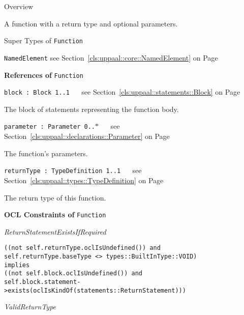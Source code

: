 	\begin{longdescription}
		\item[Overview] 		
				

	

		A function with a return type and optional parameters.		
		\item[Super Types of \texttt{Function}] ~
			\begin{longdescription}
				\item[\texttt{NamedElement}] see Section~\ref{cls:uppaal::core::NamedElement} on Page~\pageref{cls:uppaal::core::NamedElement}						\end{longdescription}
		
	
			\item[\textbf{References of} \texttt{Function}] ~
			\begin{longdescription}
	\item[\texttt{block : Block 	\symbol{"5B}1..1\symbol{"5D}
}] ~
	see Section~\ref{cls:uppaal::statements::Block} on Page~\pageref{cls:uppaal::statements::Block}
	
	\nopagebreak
		
				

	

		The block of statements representing the function body.		
	\item[\texttt{parameter : Parameter 	\symbol{"5B}0..$*$\symbol{"5D}
}] ~
	see Section~\ref{cls:uppaal::declarations::Parameter} on Page~\pageref{cls:uppaal::declarations::Parameter}
	
	\nopagebreak
		
				

	

		The function's parameters.		
	\item[\texttt{returnType : TypeDefinition 	\symbol{"5B}1..1\symbol{"5D}
}] ~
	see Section~\ref{cls:uppaal::types::TypeDefinition} on Page~\pageref{cls:uppaal::types::TypeDefinition}
	
	\nopagebreak
		
				

	

		The return type of this function.		
			\end{longdescription}
			\item[\textbf{OCL Constraints of} \texttt{Function}] ~
			\begin{longdescription}
	\item[\small\textit{ReturnStatementExistsIfRequired}] ~ 
	\nopagebreak
	
		\begin{lstlisting}[breaklines=true]
((not self.returnType.oclIsUndefined()) and
self.returnType.baseType <> types::BuiltInType::VOID) 
implies
((not self.block.oclIsUndefined()) and 
self.block.statement->exists(oclIsKindOf(statements::ReturnStatement)))		\end{lstlisting}
	\item[\small\textit{ValidReturnType}] ~ 
	\nopagebreak
	

\end{longdescription}
\end{longdescription}
